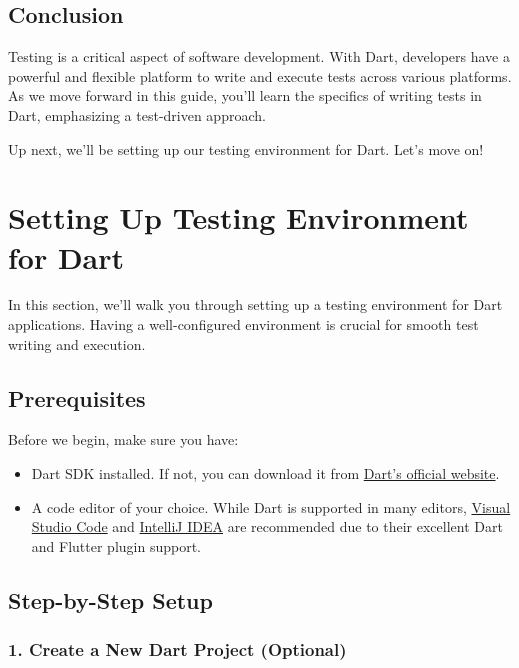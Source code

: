 \documentclass[
]{article}
\providecommand{\tightlist}{%
  \setlength{\itemsep}{0pt}\setlength{\parskip}{0pt}}
\begin{document}
\subsection{Conclusion}\label{conclusion}

Testing is a critical aspect of software development. With Dart,
developers have a powerful and flexible platform to write and execute
tests across various platforms. As we move forward in this guide, you'll
learn the specifics of writing tests in Dart, emphasizing a test-driven
approach.

Up next, we'll be setting up our testing environment for Dart. Let's
move on!

\section{Setting Up Testing Environment for
Dart}\label{setting-up-testing-environment-for-dart}

In this section, we'll walk you through setting up a testing environment
for Dart applications. Having a well-configured environment is crucial
for smooth test writing and execution.

\subsection{Prerequisites}\label{prerequisites}

Before we begin, make sure you have:

\begin{itemize}
\tightlist
\item
  Dart SDK installed. If not, you can download it from
  \href{https://dart.dev/get-dart}{Dart's official website}.
\item
  A code editor of your choice. While Dart is supported in many editors,
  \href{https://code.visualstudio.com/}{Visual Studio Code} and
  \href{https://www.jetbrains.com/idea/}{IntelliJ IDEA} are recommended
  due to their excellent Dart and Flutter plugin support.
\end{itemize}

\subsection{Step-by-Step Setup}\label{step-by-step-setup}

\subsubsection{1. Create a New Dart Project
(Optional)}\label{create-a-new-dart-project-optional}
\end{document}
